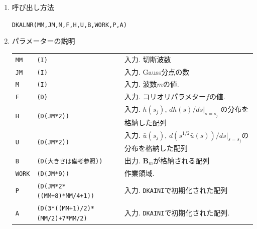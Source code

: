 \documentclass[a4j,fleqn]{jarticle}
\begin{document}
\begin{enumerate}
\[\begin{array}{l}
\vdots\\
\hat v^m_{N_m-1}
\end{array}
\right]
\]
と表した場合の$(3N_m+3)\times(3N_m+3)$行列${\boldsymbol B}_m$を,
$m=0$の場合には,
展開式(\ref{th0expn}), (\ref{tu0expn})および$\tilde v^0$のかわりに
$i\tilde v^0$を(\ref{tv0expn})の形に展開したものに基いて
式(\ref{lh})--(\ref{lv})を
\[
\omega
\left[
\begin{array}{l}
\hat h^0_1\\
\vdots\\
\hat h^0_{N_0}\\
\hat u^0_0\\
\vdots\\
\hat u^0_{N_0}\\
\hat v^0_1\\
\vdots\\
\hat u^0_{N_0}
\end{array}
\right]
={\boldsymbol B}_0
\left[
\begin{array}{l}
\hat h^0_1\\
\vdots\\
\hat h^0_{N_0}\\
\hat u^0_0\\
\vdots\\
\hat u^0_{N_0}\\
\hat v^0_1\\
\vdots\\
\hat u^0_{N_0}
\end{array}
\right]
\]
と表した場合の$(3N_0+1)\times(3N_0+1)$行列${\boldsymbol B}_0$を
それぞれ求めるものである($m=0$の場合, 定数成分$\hat h^0_0$は
固有値問題に関係しない).

\item 呼び出し方法 
    
{\tt DKALNR(MM,JM,M,F,H,U,B,WORK,P,A)}
  
\item パラメーターの説明 
    
\begin{tabular}{lll}
{\tt MM} & {\tt (I)} & 入力. 切断波数\\
{\tt JM} & {\tt (I)} & 入力. Gauss分点の数\\
{\tt M}   & {\tt (I)} & 入力. 波数$m$の値.\\
{\tt F}   & {\tt (D)} & 入力. コリオリパラメター$f$の値.\\
{\tt H}   & {\tt (D(JM*2))} & 入力. $\bar h(s_j)$, $d\bar h(s)/ds|_{s=s_j}$
                              の分布を格納した配列\\
{\tt U}   & {\tt (D(JM*2))} & 入力. $\bar u(s_j)$,
                         $d(s^{1/2}\bar u(s))/ds|_{s=s_j}$の分布を格納した配列\\
{\tt B}   & {\tt (D(大きさは備考参照))} & 出力.
${\boldsymbol B}_m$が格納される配列\\
{\tt WORK}   & {\tt (D(JM*9))} & 作業領域.\\
{\tt P}  & {\tt (D(JM*2*((MM+8)*MM/4+1))} & 入力. {\tt DKAINI}で初期化された配列\\
{\tt A}  & {\tt (D(3*((MM+1)/2)*(MM/2)+7*MM/2)} & 入力. {\tt DKAINI}で初期化された配列.
\end{tabular}


\end{enumerate}
\end{document}

